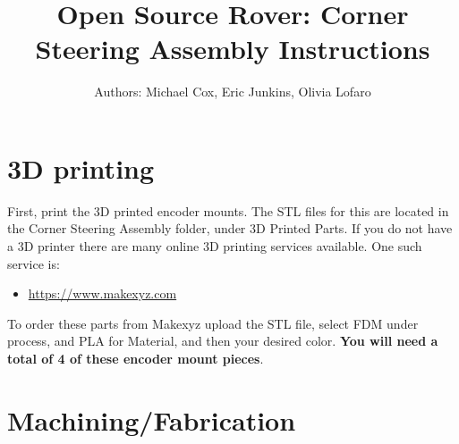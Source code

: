 \documentclass[12pt]{article}
\begin{document}
\newcommand\partimg{\includegraphics[width=2cm,height=1.25cm,keepaspectratio]}


\title{Open Source Rover: Corner Steering Assembly Instructions}
\author{Authors: Michael Cox, Eric Junkins, Olivia Lofaro}

\makeatletter
\def\@maketitle{
\begin{center}
	\makebox[\textwidth][c]{ \texttt{[image: "Pictures/Corner Title".png]}}
	{\Huge \bfseries \sffamily \@title }\\[3ex]
	{\Large \sffamily \@author}\\[3ex]
	\texttt{[image: "Pictures/JPL logo".png]}
\end{center}}
\makeatother

\maketitle



\newpage

\tableofcontents


\section{3D printing}
First, print the 3D printed encoder mounts. The STL files for this are located in the Corner Steering Assembly folder, under 3D Printed Parts. If you do not have a 3D printer there are many online 3D printing services available. One such service is:

\begin{itemize}
	\item \href{https://www.makexyz.com}{https://www.makexyz.com}
\end{itemize}

To order these parts from Makexyz upload the STL file, select FDM under process, and PLA for Material, and then your desired color. \textbf{You will need a total of 4 of these encoder mount pieces}.

\section{Machining/Fabrication}
\end{document}
